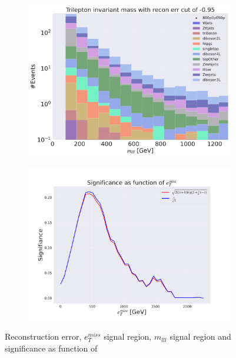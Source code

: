 \begin{figure}[H]
    \hfill
    \begin{subfigure}{.40\textwidth}
        \includegraphics[width=\textwidth]{Figures/AE_testing/big/3lep/b_data_recon_big_rm3_feats_sig_800p0p050p_mlll_recon_errcut_-0.95.pdf}
        \caption{}
        \label{fig:AE_3lep_big_mlll_800_2}
    \end{subfigure}
    \hfill   
    \begin{subfigure}{.40\textwidth}
        \includegraphics[width=\textwidth]{Figures/AE_testing/big/3lep/significance_etmiss_800p0p050p_-0.9544944422260757.pdf}
        \caption{}
        \label{fig:AE_3lep_big_signi_800_2}
    \end{subfigure}
    \hfill      
    \caption[3lep deep network | $800p50$ | AE | 2]{Reconstruction error, $e_T^{miss}$ signal region, $m_{lll}$ signal region and significance as function of 
}
\end{figure}
